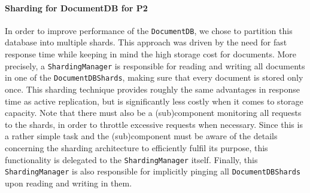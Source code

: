 \documentclass[a4paper,10pt]{article}
\begin{document}
\paragraph{Sharding for DocumentDB for P2}
In order to improve performance of the \texttt{DocumentDB}, we chose to partition this database into multiple shards. This approach was driven by the need for fast response time while keeping in mind the high storage cost for documents. More precisely, a \texttt{ShardingManager} is responsible for reading and writing all documents in one of the \texttt{DocumentDBShards}, making sure that every document is stored only once. This sharding technique provides roughly the same advantages in response time as active replication, but is significantly less costly when it comes to storage capacity.
Note that there must also be a (sub)component monitoring all requests to the shards, in order to throttle excessive requests when necessary. Since this is a rather simple task and the (sub)component must be aware of the details concerning the sharding architecture to efficiently fulfil its purpose, this functionality is delegated to the \texttt{ShardingManager} itself. Finally, this \texttt{ShardingManager} is also responsible for implicitly pinging all \texttt{DocumentDBShards} upon reading and writing in them.
\end{document}
